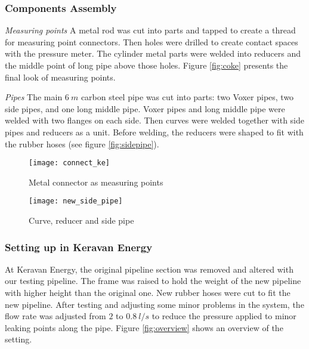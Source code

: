 \subsubsection{Components Assembly}

\textit{Measuring points}\newline
A metal rod was cut into parts and tapped to create a thread for measuring point connectors. Then holes were drilled to create contact spaces with the pressure meter. The cylinder metal parts were welded into reducers and the middle point of long pipe above those holes. Figure \vref{fig:coke} presents the final look of measuring points.

\textit{Pipes}\newline
The main $6\ m$ carbon steel pipe was cut into parts: two Voxer pipes, two side pipes, and one long middle pipe. Voxer pipes and long middle pipe were welded with two flanges on each side. Then curves were welded together with side pipes and reducers as a unit. Before welding, the reducers were shaped to fit with the rubber hoses (see figure \vref{fig:sidepipe}).

\begin{figure}[!htb]
   \begin{minipage}{0.48\textwidth}
     \centering
     \texttt{[image: connect\_ke]}
     \caption{Metal connector as measuring points}\label{fig:coke}
   \end{minipage}\hfill
   \begin {minipage}{0.48\textwidth}
     \centering
     \texttt{[image: new\_side\_pipe]}
     \caption{Curve, reducer and side pipe}\label{fig:sidepipe}
   \end{minipage}
\end{figure}

\subsubsection{Setting up in Keravan Energy}

At Keravan Energy, the original pipeline section was removed and altered with our testing pipeline. The frame was raised to hold the weight of the new pipeline with higher height than the original one. New rubber hoses were cut to fit the new pipeline. After testing and adjusting some minor problems in the system, the flow rate was adjusted from $2$ to $0.8\ l/s$ to reduce the pressure applied to minor leaking points along the pipe. Figure \vref{fig:overview} shows an overview of the setting.

